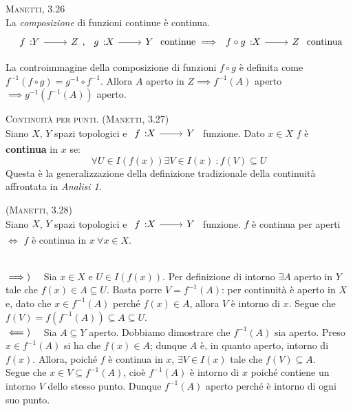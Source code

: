 \begin{theorema}\textsc{Manetti, 3.26}\\ \label{compfunzcont}
La \textit{composizione} di funzioni continue è continua.
\begin{equation}
\funz{f}{Y}{Z},\ \funz{g}{X}{Y}\text{ continue}\implies \funz{f\circ g}{X}{Z}\text{ continua}
\end{equation}
\vspace{-6mm}
\end{theorema}
\begin{demonstration}
La controimmagine della composizione di funzioni $f\circ g$ è definita come $f^{-1}\left(f\circ g\right)=g^{-1}\circ f^{-1}$. Allora $A$ aperto in $Z\implies f^{-1}\left(A\right)$ aperto $\implies g^{-1}\left(f^{-1}\left(A\right)\right)$ aperto.
\end{demonstration}
\begin{define}\textsc{Continuità per punti.} \textsc{(Manetti, 3.27)}\\
Siano $X$, $Y$ spazi topologici e $\funz{f}{X}{Y}$ funzione. Dato $x\in X$ $f$ è \textbf{continua} in $x$ se:
\begin{equation}
	\forall U\in I\left(f\left(x\right)\right)\exists V\in I\left(x\right)\ \colon f\left(V\right)\subseteq U
\end{equation}
Questa è la generalizzazione della definizione tradizionale della continuità affrontata in \textit{Analisi 1}.
\end{define}
\begin{theorema}\textsc{(Manetti, 3.28)}\\
Siano $X$, $Y$ spazi topologici e $\funz{f}{X}{Y}$ funzione. $f$ è continua per aperti $\iff$ $f$ è continua in $x\ \forall x\in X$.
\end{theorema}
\begin{demonstration}~{}\\
$\implies)\quad$ Sia $x\in X$ e $U\in I\left(f\left(x\right)\right)$. Per definizione di intorno $\exists A$ aperto in $Y$ tale che $f\left(x\right)\in A\subseteq U$.
Basta porre $V=f^{-1}\left(A\right)$: per continuità è aperto in $X$ e, dato che $x\in f^{-1}\left(A\right)$ perché $f\left(x\right)\in A$, allora $V$ è intorno di $x$. Segue che $f\left(V\right)=f\left(f^{-1}\left(A\right)\right)\subseteq A\subseteq U$.\\
$\impliedby)\quad$ Sia $A\subseteq Y$ aperto. Dobbiamo dimostrare che $f^{-1}\left(A\right)$ sia aperto. Preso $x\in f^{-1}\left(A\right)$ si ha che $f\left(x\right)\in A$; dunque $A$ è, in quanto aperto, intorno di $f\left(x\right)$. Allora, poiché $f$ è continua in $x$, $\exists V\in I\left(x\right)$ tale che $f\left(V\right)\subseteq A$.\\
Segue che $x\in V\subseteq f^{-1}\left(A\right)$, cioè $f^{-1}\left(A\right)$ è intorno di $x$ poiché contiene un intorno $V$ dello stesso punto. Dunque $f^{-1}\left(A\right)$ aperto perché è intorno di ogni suo punto.
\end{demonstration}
